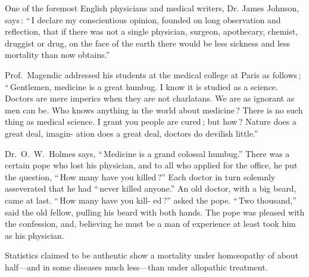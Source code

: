 \documentclass[10pt]{article}
\begin{document}
\begin{multicols}{3}
	One of the foremost English physicians and medical writers, Dr.\linebreak
	James Johnson, says\,: ``\,I declare my conscientious opinion, founded on\linebreak
	long observation and reflection, that if there was not a single physician,\linebreak
	surgeon, apothecary, chemist, druggist or drug, on the face of the earth\linebreak
	there would be less sickness and less mortality than now obtains.''

	Prof.~Magendic addressed his students at the medical college at Paris\linebreak
	as follows\,; ``\,Gentlemen, medicine is a great humbug. I know it is\linebreak
	studied as a science. Doctors are mere imperics when they are not\linebreak
	charlatans. We are as ignorant as men can be. Who knows anything in\linebreak
	the world about medicine\,? There is no such thing as medical science. I\linebreak
	grant you people are cured\,; but how\,? Nature does a great deal, imagin-\linebreak
	ation does a great deal, doctors do devilish little.''

	Dr.~O.~W.~Holmes says, ``\,Medicine is a grand colossal humbug.''\linebreak
	There was a certain pope who lost his physician, and to all who applied for\linebreak
	the office, he put the question, ``\,How many have you killed\,?'' Each\linebreak
	doctor in turn solemnly asseverated that he had ``\,never killed anyone.''\linebreak
	An old doctor, with a big beard, came at last. ``\,How many have you kill-\linebreak
	ed\,?'' asked the pope. ``\,Two thousand,'' said the old fellow, pulling his\linebreak
	beard with both hands. The pope was pleased with the confession, and,\linebreak
	believing he must be a man of experience at least took him as his physician.

	Statistics claimed to be authentic show a mortality under hom{\oe}opathy\linebreak
	of about half---and in some diseases much less---than under allopathic\linebreak
	treatment.


\end{multicols}
\end{document}
